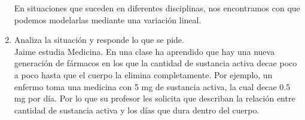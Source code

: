 \documentclass[11pt]{book}
\begin{document}
\begin{enumerate}
        En situaciones que suceden en diferentes disciplinas, nos encontramos con que podemos modelarlas mediante una variación lineal.\\
        \newpage
  \item Analiza la situación y responde lo que se pide.\\

        Jaime estudia Medicina. En una clase ha aprendido que hay una nueva generación de fármacos en los que la cantidad de
        sustancia activa decae poco a poco hasta que el cuerpo la elimina completamente. Por ejemplo, un enfermo toma una
        medicina con 5 mg de sustancia activa, la cual decae 0.5 mg por día. Por lo que su profesor les solicita que describan
        la relación entre cantidad de sustancia activa y los días que dura dentro del cuerpo.


\end{enumerate}
\end{document}
